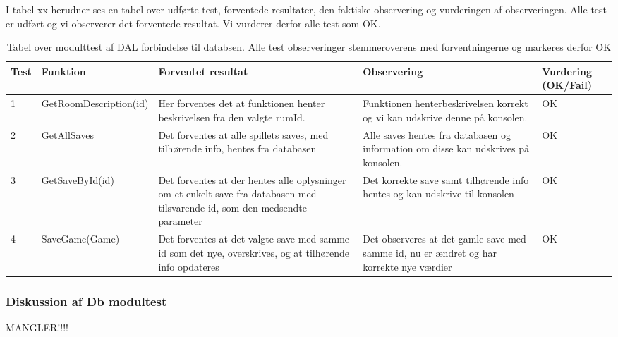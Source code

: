 I tabel xx herudner ses en tabel over udførte test, forventede resultater, den faktiske observering og vurderingen af observeringen.
Alle test er udført og vi observerer det forventede resultat. Vi vurderer derfor alle test som OK.

\begin{table}[H]
\caption{Tabel over modulttest af DAL forbindelse til databsen. Alle test observeringer stemmeroverens med forventningerne og markeres derfor OK }
\begin{tabular}{|p{0.75cm}|p{3.6cm}|p{3.5cm}|p{3.5cm}|p{1.9cm}|} \hline
 \textbf{Test} & \textbf{Funktion} & \textbf{Forventet resultat} & \textbf{Observering} & \textbf{Vurdering} \textbf{(OK/Fail)}\\\hline
 1 & GetRoomDescription(id) & Her forventes det at funktionen henter beskrivelsen fra den valgte rumId. & Funktionen henterbeskrivelsen korrekt og vi kan udskrive denne på konsolen. & OK \\ \hline
 2 & GetAllSaves & Det forventes at alle spillets saves, med tilhørende info, hentes fra databasen & Alle saves hentes fra databasen og information om disse kan udskrives på konsolen. & OK \\ \hline
 3 & GetSaveById(id) & Det forventes at der hentes alle oplysninger om et enkelt save fra databasen med tilsvarende id, som den medsendte parameter & Det korrekte save samt tilhørende info hentes og kan udskrive til konsolen & OK \\ \hline
 4 & SaveGame(Game) & Det forventes at det valgte save med samme id som det nye, overskrives, og at tilhørende info opdateres & Det observeres at det gamle save med samme id, nu er ændret og har korrekte nye værdier & OK \\ \hline
\end{tabular}
\end{table}

\subsubsection{Diskussion af Db modultest}

MANGLER!!!!

